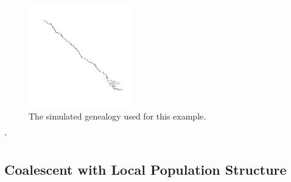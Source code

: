 \documentclass{ieeeaccess}
\theoremstyle{definition}
\begin{document}
\begin{figure}[H]
  \centering
    \includegraphics[width=0.4\textwidth]{../R/tree}
    \caption{The simulated genealogy used for this example.}
\end{figure}'
\subsection{Coalescent with Local Population Structure}
\end{document}
